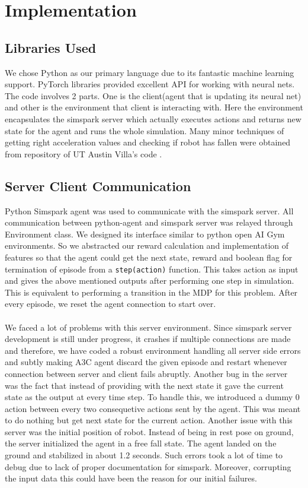 \chapter{Implementation}

\section{Libraries Used}
We chose Python as our primary language due to its fantastic machine learning support. PyTorch libraries provided excellent API for working with neural nets. The code involves 2 parts. One is the client(agent that is updating its neural net) and other is the environment that client is interacting with. Here the environment encapsulates the simspark server which actually executes actions and returns new state for the agent and runs the whole simulation. Many minor techniques of getting right acceleration values and checking if robot has fallen were obtained from repository of UT Austin Villa's code \cite{utaustin}. 

\section{Server Client Communication} 
Python Simspark agent \cite{pysimspark} was used to communicate with the simspark server. All communication between python-agent and simspark server was relayed through Environment class. We designed its interface similar to python open AI Gym environments. So we abstracted our reward calculation and implementation of features so that the agent could get the next state, reward and boolean flag for termination of episode from  a \texttt{step(action)} function. This takes action as input and gives the above mentioned outputs after performing one step in simulation. This is equivalent to performing a transition in the MDP \cite{Sutton:1998:IRL:551283} for this problem. After every episode, we reset the agent connection to start over. 
\\\\
We faced a lot of problems with this server environment. Since simspark server development is still under progress, it crashes if multiple connections are made and therefore, we have coded a robust environment handling all server side errors and subtly making A3C agent discard the given episode and restart whenever connection between server and client fails abruptly. Another bug in the server was the fact that instead of providing with the next state it gave the current state as the output at every time step. To handle this, we introduced a dummy 0 action between every two consequetive actions sent by the agent. This was meant to do nothing but get next state for the current action. Another issue with this server was the initial position of robot. Instead of being in rest pose on ground, the server initialized the agent in a free fall state. The agent landed on the ground and stabilized in about 1.2 seconds. Such errors took a lot of time to debug due to lack of proper documentation for simspark. Moreover, corrupting the input data this could have been the reason for our initial failures. 

